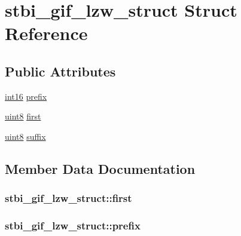 \hypertarget{structstbi__gif__lzw__struct}{}\section{stbi\+\_\+gif\+\_\+lzw\+\_\+struct Struct Reference}
\label{structstbi__gif__lzw__struct}
\subsection*{Public Attributes}
\begin{DoxyCompactItemize}
\item 
\hyperlink{stb__image_8c_a259fa4834387bd68627ddf37bb3ebdb9}{int16} \hyperlink{structstbi__gif__lzw__struct_a0e5142cb4117b905eb9efd73c436525c}{prefix}
\item 
\hyperlink{stb__image_8c_adde6aaee8457bee49c2a92621fe22b79}{uint8} \hyperlink{structstbi__gif__lzw__struct_a08129c445d56c0983285d6e0e71b83bd}{first}
\item 
\hyperlink{stb__image_8c_adde6aaee8457bee49c2a92621fe22b79}{uint8} \hyperlink{structstbi__gif__lzw__struct_a3ec7f462268018489345b79b2f123764}{suffix}
\end{DoxyCompactItemize}


\subsection{Member Data Documentation}
\hypertarget{structstbi__gif__lzw__struct_a08129c445d56c0983285d6e0e71b83bd}{}
\subsubsection[{first}]{ stbi\+\_\+gif\+\_\+lzw\+\_\+struct\+::first}\label{structstbi__gif__lzw__struct_a08129c445d56c0983285d6e0e71b83bd}
\hypertarget{structstbi__gif__lzw__struct_a0e5142cb4117b905eb9efd73c436525c}{}
\subsubsection[{prefix}]{ stbi\+\_\+gif\+\_\+lzw\+\_\+struct\+::prefix}\label{structstbi__gif__lzw__struct_a0e5142cb4117b905eb9efd73c436525c}
\hypertarget{structstbi__gif__lzw__struct_a3ec7f462268018489345b79b2f123764}{}
